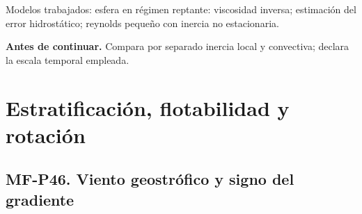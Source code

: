 \begin{tcolorbox}[studiumcheck,breakable=false,title={Síntesis y comprobación}]Modelos trabajados: esfera en régimen reptante: viscosidad inversa; estimación del error hidrostático; reynolds pequeño con inercia no estacionaria.\par\textbf{Antes de continuar.} Compara por separado inercia local y convectiva; declara la escala temporal empleada.\end{tcolorbox}

\chapter{Estratificación, flotabilidad y rotación}


\Needspace{.30\textheight}\section{MF-P46. Viento geostrófico y signo del gradiente}

